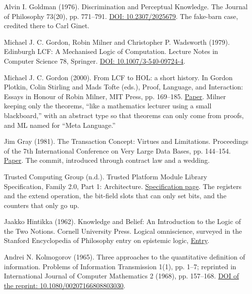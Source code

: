 \noindent Alvin I. Goldman (1976). Discrimination and Perceptual Knowledge. The Journal of Philosophy 73(20), pp. 771--791. \href{https://doi.org/10.2307/2025679}{DOI: 10.2307/2025679}. The fake-barn case, credited there to Carl Ginet.
\par\medskip

\noindent Michael J. C. Gordon, Robin Milner and Christopher P. Wadsworth (1979). Edinburgh LCF: A Mechanised Logic of Computation. Lecture Notes in Computer Science 78, Springer. \href{https://doi.org/10.1007/3-540-09724-4}{DOI: 10.1007/3-540-09724-4}.
\par\medskip

\noindent Michael J. C. Gordon (2000). From LCF to HOL: a short history. In Gordon Plotkin, Colin Stirling and Mads Tofte (eds.), Proof, Language, and Interaction: Essays in Honour of Robin Milner, MIT Press, pp. 169--185. \href{https://www.cl.cam.ac.uk/archive/mjcg/papers/HolHistory.pdf}{Paper}. Milner keeping only the theorems, ``like a mathematics lecturer using a small blackboard,'' with an abstract type so that theorems can only come from proofs, and ML named for ``Meta Language.''
\par\medskip

\noindent Jim Gray (1981). The Transaction Concept: Virtues and Limitations. Proceedings of the 7th International Conference on Very Large Data Bases, pp. 144--154. \href{https://jimgray.azurewebsites.net/papers/thetransactionconcept.pdf}{Paper}. The commit, introduced through contract law and a wedding.
\par\medskip

\noindent Trusted Computing Group (n.d.). Trusted Platform Module Library Specification, Family 2.0, Part 1: Architecture. \href{https://trustedcomputinggroup.org/resource/tpm-library-specification/}{Specification page}. The registers and the extend operation, the bit-field slots that can only set bits, and the counters that only go up.
\par\medskip

\noindent Jaakko Hintikka (1962). Knowledge and Belief: An Introduction to the Logic of the Two Notions. Cornell University Press. Logical omniscience, surveyed in the Stanford Encyclopedia of Philosophy entry on epistemic logic, \href{https://plato.stanford.edu/entries/logic-epistemic/}{Entry}.
\par\medskip

\noindent Andrei N. Kolmogorov (1965). Three approaches to the quantitative definition of information. Problems of Information Transmission 1(1), pp. 1--7; reprinted in International Journal of Computer Mathematics 2 (1968), pp. 157--168. \href{https://doi.org/10.1080/00207166808803030}{DOI of the reprint: 10.1080/00207166808803030}.
\par\medskip

